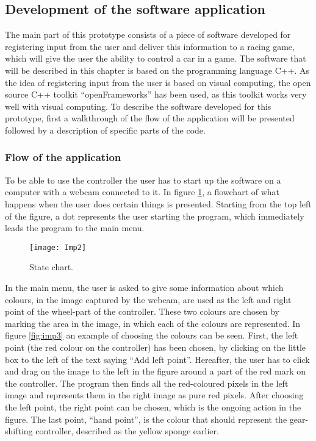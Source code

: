\subsection{Development of the software application}
The main part of this prototype consists of a piece of software developed for registering input from the user and deliver this information to a racing game, which will give the user the ability to control a car in a game. 
The software that will be described in this chapter is based on the programming language C++. 
As the idea of registering input from the user is based on visual computing, the open source C++ toolkit “openFrameworks” has been used, as this toolkit works very well with visual computing.
To describe the software developed for this prototype, first a walkthrough of the flow of the application will be presented followed by a description of specific parts of the code.

\subsubsection{Flow of the application}
To be able to use the controller the user has to start up the software on a computer with a webcam connected to it. 
In figure \ref{fig:imp2}, a flowchart of what happens when the user does certain things is presented. 
Starting from the top left of the figure, a dot represents the user starting the program, which immediately leads the program to the main menu.
\bigskip

\begin{figure}[!htbp]
\centering
\texttt{[image: Imp2]}
\caption{State chart.} 
\label{fig:imp2}
\end{figure}

In the main menu, the user is asked to give some information about which colours, in the image captured by the webcam, are used as the left and right point of the wheel-part of the controller. 
These two colours are chosen by marking the area in the image, in which each of the colours are represented. 
In figure \ref{fig:imp3} an example of choosing the colours can be seen. 
First, the left point (the red colour on the controller) has been chosen, by clicking on the little box to the left of the text saying “Add left point”.
Hereafter, the user has to click and drag on the image to the left in the figure around a part of the red mark on the controller. 
The program then finds all the red-coloured pixels in the left image and represents them in the right image as pure red pixels. 
After choosing the left point, the right point can be chosen, which is the ongoing action in the figure. 
The last point, “hand point”, is the colour that should represent the gear-shifting controller, described as the yellow sponge earlier.
\bigskip

